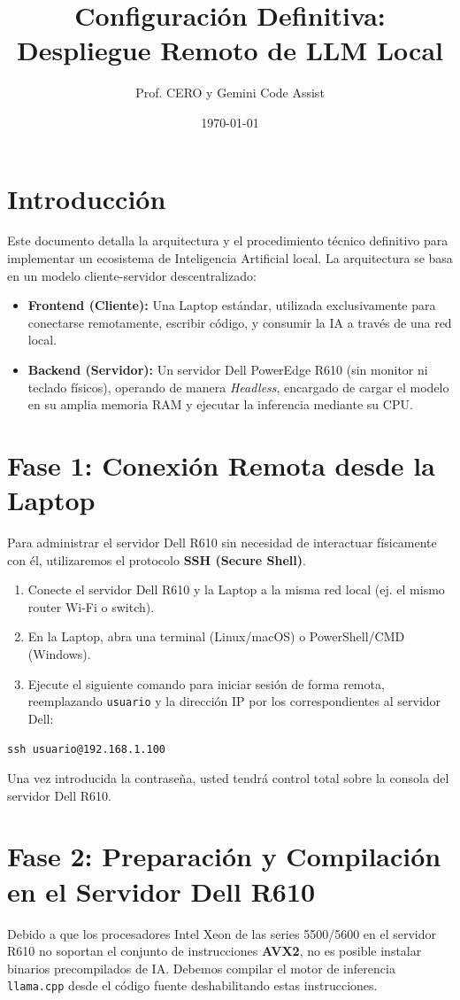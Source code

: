 \documentclass[12pt,a4paper]{article}
\title{Configuración Definitiva: Despliegue Remoto de LLM Local}
\author{Prof. CERO y Gemini Code Assist}
\date{\today}
\begin{document}
\maketitle
\tableofcontents
\newpage

\section{Introducción}
Este documento detalla la arquitectura y el procedimiento técnico definitivo para implementar un ecosistema de Inteligencia Artificial local. La arquitectura se basa en un modelo cliente-servidor descentralizado:
\begin{itemize}
    \item \textbf{Frontend (Cliente):} Una Laptop estándar, utilizada exclusivamente para conectarse remotamente, escribir código, y consumir la IA a través de una red local.
    \item \textbf{Backend (Servidor):} Un servidor Dell PowerEdge R610 (sin monitor ni teclado físicos), operando de manera \textit{Headless}, encargado de cargar el modelo en su amplia memoria RAM y ejecutar la inferencia mediante su CPU.
\end{itemize}

\section{Fase 1: Conexión Remota desde la Laptop}
Para administrar el servidor Dell R610 sin necesidad de interactuar físicamente con él, utilizaremos el protocolo \textbf{SSH (Secure Shell)}.

\begin{enumerate}
    \item Conecte el servidor Dell R610 y la Laptop a la misma red local (ej. el mismo router Wi-Fi o switch).
    \item En la Laptop, abra una terminal (Linux/macOS) o PowerShell/CMD (Windows).
    \item Ejecute el siguiente comando para iniciar sesión de forma remota, reemplazando \texttt{usuario} y la dirección IP por los correspondientes al servidor Dell:
\end{enumerate}

\begin{verbatim}
ssh usuario@192.168.1.100
\end{verbatim}
Una vez introducida la contraseña, usted tendrá control total sobre la consola del servidor Dell R610.

\section{Fase 2: Preparación y Compilación en el Servidor Dell R610}
Debido a que los procesadores Intel Xeon de las series 5500/5600 en el servidor R610 no soportan el conjunto de instrucciones \textbf{AVX2}, no es posible instalar binarios precompilados de IA. Debemos compilar el motor de inferencia \texttt{llama.cpp} desde el código fuente deshabilitando estas instrucciones.
\end{document}
